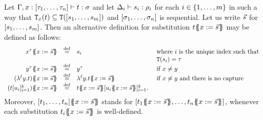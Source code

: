 \begin{definition}
Let $\Gamma,x : [\tau_1,\hdots,\tau_n] \vdash t : \sigma$
and let $\Delta_i \vdash s_i : \rho_i$ for each $i \in \{1,\hdots,m\}$
in such a way that $\mathtt{T}_{x}(t) \subseteq \mathtt{T}([s_1,\hdots,s_m])$
and $[\sigma_1,\hdots,\sigma_n]$ is sequential.
Let us write $\vec{s}$ for $[s_1,\hdots,s_m]$.
Then an alternative definition for substitution $t\{\!\!\{x := \vec{s}\}\!\!\}$
may be defined as follows:
\[
  \begin{array}{rcll}
    \var^{\typ}\sub{\var}{\ls{\tmtwo}}                 & \eqdef & \tmtwo_i & \text{ where $i$ is the unique index such that} \\
                                                                         &&& \text{ $\tmlabel{\tmtwo_i} = \typ$}\\
    \vartwo^{\typ}\sub{\var}{\ls{\tmtwo}}              & \eqdef & \vartwo^\typ & \text{ if $\var \neq \vartwo$} \\
    (\lamp{\lab}{\vartwo}{\tm})\sub{\var}{\ls{\tmtwo}} & \eqdef & \lamp{\lab}{\vartwo}{\tm\sub{\var}{\ls{\tmtwo}}} & \text{ if $\var \neq \vartwo$ and there is no capture}\\
    (\tm[\tmthree_i]_{i=1}^{k})\sub{\var}{\ls{\tmtwo}} & \eqdef & \tm\sub{\var}{\ls{\tmtwo}}[\tmthree_i\sub{\var}{\ls{\tmtwo}}]_{i=1}^{k}.
  \end{array}
\]
Moreover,
$[t_1,\hdots,t_n]\{\!\!\{x := \vec{s}\}\!\!\}$
stands for $[\tm_1\sub{\var}{\ls{\tmtwo}},\hdots,\tm_n\sub{\var}{\ls{\tmtwo}}]$,
whenever each substitution $t_i\{\!\!\{x := \vec{s}\}\!\!\}$ is well-defined.
\end{definition}

